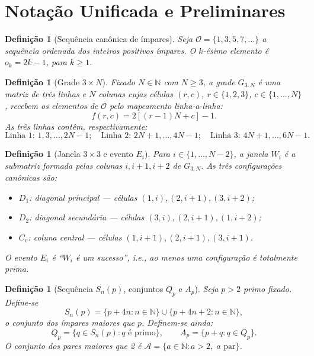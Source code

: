 \documentclass[12pt,a4paper]{article}
\newtheorem{definition}[theorem]{Defini\c{c}\~ao}
\theoremstyle{remark}
\newcommand{\calO}{\mathcal{O}}
\newcommand{\calA}{\mathcal{A}}
\newcommand{\NN}{\mathbb{N}}
\begin{document}
	\section{Nota\c{c}\~ao Unificada e Preliminares}
	
	\begin{definition}[Sequência canônica de ímpares]
		Seja $\calO = \{1,3,5,7,\ldots\}$ a sequ\^encia ordenada dos inteiros positivos
		\'impares. O $k$-\'esimo elemento \'e $o_k = 2k-1$, para $k\geq 1$.
	\end{definition}
	
	\begin{definition}[Grade $3\times N$]
		Fixado $N\in\NN$ com $N\geq 3$, a grade $G_{3,N}$ \'e uma matriz de tr\^es linhas
		e $N$ colunas cujas c\'elulas $(r,c)$, $r\in\{1,2,3\}$, $c\in\{1,\ldots,N\}$,
		recebem os elementos de $\calO$ pelo mapeamento linha-a-linha:
		\[
		f(r,c) = 2[(r-1)N + c] - 1.
		\]
		As tr\^es linhas cont\^em, respectivamente:
		\[
		\text{Linha 1: } 1,3,\ldots,2N-1;\quad
		\text{Linha 2: } 2N+1,\ldots,4N-1;\quad
		\text{Linha 3: } 4N+1,\ldots,6N-1.
		\]
	\end{definition}
	
	\begin{definition}[Janela $3\times3$ e evento $E_i$]
		Para $i\in\{1,\ldots,N-2\}$, a janela $W_i$ \'e a submatriz formada
		pelas colunas $i,i+1,i+2$ de $G_{3,N}$.  As tr\^es configura\c{c}\~oes
		can\^onicas s\~ao:
		\begin{itemize}
			\item $D_1$: diagonal principal --- c\'elulas $(1,i),(2,i+1),(3,i+2)$;
			\item $D_2$: diagonal secund\'aria --- c\'elulas $(3,i),(2,i+1),(1,i+2)$;
			\item $C_v$: coluna central --- c\'elulas $(1,i+1),(2,i+1),(3,i+1)$.
		\end{itemize}
		O evento $E_i$ \'e ``$W_i$ \'e um sucesso'', i.e., ao menos uma configura\c{c}\~ao
		\'e totalmente prima.
	\end{definition}
	
	\begin{definition}[Sequência $S_n(p)$, conjuntos $Q_p$ e $A_p$]
		Seja $p>2$ primo fixado.  Define-se
		\[
		S_n(p) = \{p+4n : n\in\NN\}\cup\{p+4n+2 : n\in\NN\},
		\]
		o conjunto dos \'impares maiores que $p$.  Definem-se ainda:
		\[
		Q_p = \{q\in S_n(p) : q\text{ \'e primo}\},\qquad
		A_p = \{p+q : q\in Q_p\}.
		\]
		O conjunto dos pares maiores que 2 \'e
		$\calA = \{a\in\NN : a > 2,\; a\text{ par}\}$.
	\end{definition}
	
\end{document}
